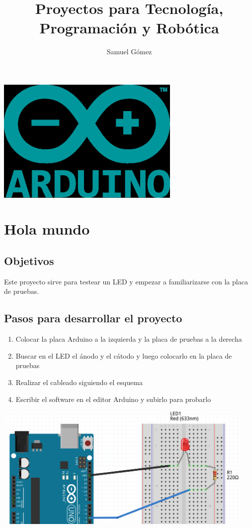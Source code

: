 \documentclass[11pt,spanish,a4paper]{article}
\title{Proyectos para Tecnología, Programación y Robótica}
\author{Samuel Gómez}
\begin{document}
\maketitle
\vspace{2cm}
\begin{center}
\includegraphics[height=6cm]{img/arduino_logo.jpg}
\end{center}

\newpage
\tableofcontents
\newpage
\section{Hola mundo}

\subsection{Objetivos}
Este proyecto sirve para testear un LED y empezar a familiarizarse con la
placa de pruebas.

\subsection{Pasos para desarrollar el proyecto}
\begin{enumerate}
	\item Colocar la placa Arduino a la izquierda y la placa de pruebas a la derecha
	\item Buscar en el LED el ánodo y el cátodo y luego colocarlo en la placa de pruebas
	\item Realizar el cableado siguiendo el esquema
	\item Escribir el software en el editor Arduino y subirlo para probarlo
\end{enumerate}

\begin{center}
\includegraphics[height=6cm]{img/01.jpg}
\end{center}
\end{document}
